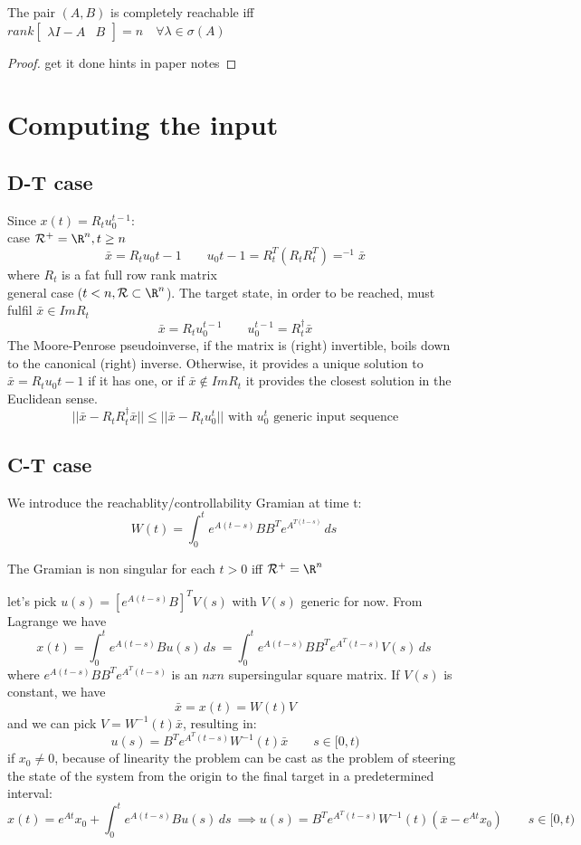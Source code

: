 \documentclass[english]{lectures}
\begin{document}
\begin{theorem}
    The pair $(A,B)$ is completely reachable iff $rank\begin{bmatrix}
        \lambda I-A & B
    \end{bmatrix}=n \quad \forall \lambda \in \sigma(A)$
\end{theorem}
\begin{proof}
    get it done hints in paper notes
\end{proof}

\section{Computing the input}

\subsection{D-T case}
Since \(x(t)=R_tu_0^{t-1}\):\\
case \(\mathcal{R}^+=\R^n, t\geq n\)
\[
\bar{x}=R_tu_0{t-1} \qquad u_0{t-1}=R^T_t(R_tR^T_t)=^{-1}\bar{x}
\]
where $R_t$ is a fat full row rank matrix\\
general case (\(t<n, \mathcal{R}\subset \R^n\)). The target state, in order to be reached, must fulfil \(\bar{x} \in ImR_t\)
\[
\bar{x}=R_tu_0^{t-1} \qquad u_0^{t-1}={R}_t^{\dagger} \bar{x}
\]
The Moore-Penrose pseudoinverse, if the matrix is (right) invertible, boils down to the canonical (right) inverse. Otherwise, it provides a unique solution to \(\bar{x}=R_tu_0{t-1}\) if it has one, or if \(\bar{x}\notin ImR_t\) it provides the closest solution in the Euclidean sense.
\[
||\bar{x}-R_tR_t^{\dagger}\bar{x}||\leq ||\bar{x}-R_tu_0^t|| \text{ with } u_0^t \text{ generic input sequence}
\]

\subsection{C-T case}
We introduce the reachablity/controllability Gramian at time t:
\[
W(t)=\int_0^te^{A(t-s)}BB^Te^{A^{T(t-s)}}\,ds\
\]
\begin{result}
    The Gramian is non singular for each $t>0$ iff $\mathcal{R}^+=\R^n$
\end{result}
let's pick \(u(s)=\left[e^{A(t-s)}B\right]^TV(s)\) with $V(s)$ generic for now. From Lagrange we have
\[
x(t)=\int_0^t e^{A(t-s)}Bu(s)\,ds\ =\int_0^t e^{A(t-s)}B B^Te^{A^T(t-s)}V(s)\,ds\
\]
where \(e^{A(t-s)}B B^Te^{A^T(t-s)}\) is an $nxn$ supersingular square matrix. If $V(s)$ is constant, we have
\[
\bar{x}=x(t)=W(t)V
\]
and we can pick \(V=W^{-1}(t)\bar{x}\), resulting in:
\[
u(s)=B^Te^{A^T(t-s)}W^{-1}(t)\bar{x} \qquad s\in [0,t)
\]
if $x_0\neq 0$, because of linearity the problem can be cast as the problem of steering the state of the system from the origin to the final target in a  predetermined interval:
\[
    x(t)=e^{At}x_0+\int_0^t e^{A(t-s)}Bu(s)\,ds\ \implies u(s)=B^Te^{A^T(t-s)}W^{-1}(t)(\bar{x}-e^{At}x_0) \qquad  s\in [0,t)
\]
\end{document}
